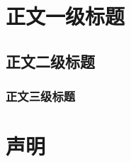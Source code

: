 \documentclass{pkuthesis}
\begin{document}
\section{正文一级标题}
\subsection{正文二级标题}
\subsubsection{正文三级标题}
\printbibliography %
\Appendix
\section{声明}
\Acknowledgments
\end{document}
